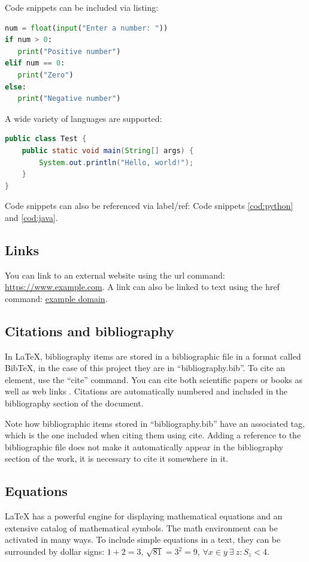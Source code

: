 Code snippets can be included via listing:

\begin{lstlisting}[language=Python, caption={Python code}, label={cod:python}, captionpos=b]
num = float(input("Enter a number: "))
if num > 0:
   print("Positive number")
elif num == 0:
   print("Zero")
else:
   print("Negative number")
\end{lstlisting}

A wide variety of languages are supported:

\begin{lstlisting}[language=Java, caption={Java coode}, label={cod:java}, captionpos=b]
public class Test {
    public static void main(String[] args) {
        System.out.println("Hello, world!");
    }
}
\end{lstlisting}

Code snippets can also be referenced via label/ref: Code snippets \ref{cod:python} and \ref{cod:java}.

\subsection{Links}
You can link to an external website using the url command: \url{https://www.example.com}. A link can also be linked to text using the href command: \href{https://www.example.com}{example domain}.

\subsection{Citations and bibliography}
In LaTeX, bibliography items are stored in a bibliographic file in a format called BibTeX, in the case of this project they are in ``bibliography.bib''. To cite an element, use the ``cite'' command. You can cite both scientific papers \cite{berners1994} or books \cite{swales1994} as well as web links \cite{webETSII}. Citations are automatically numbered and included in the bibliography section of the document.

Note how bibliographic items stored in ``bibliography.bib'' have an associated tag, which is the one included when citing them using cite. Adding a reference to the bibliographic file does not make it automatically appear in the bibliography section of the work, it is necessary to cite it somewhere in it.

\subsection{Equations}
LaTeX has a powerful engine for displaying mathematical equations and an extensive catalog of mathematical symbols. The math environment can be activated in many ways. To include simple equations in a text, they can be surrounded by dollar signs: $1 + 2 = 3$, $\sqrt{81} = 3^2 = 9$, $\forall x \in y~\exists~z : S_z < $4.

